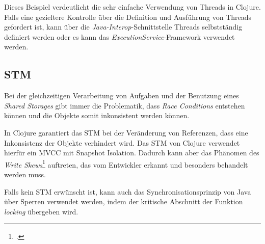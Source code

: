 Dieses Beispiel verdeutlicht die sehr einfache Verwendung von Threads in Clojure. Falls eine gezieltere Kontrolle über die Definition und Ausführung von Threads gefordert ist, kann über die \textit{Java-Interop}-Schnittstelle Threads selbstständig definiert werden oder es kann das \textit{ExecutionService}-Framework verwendet werden.

\subsection*{\acl{STM}}
Bei der gleichzeitigen Verarbeitung von Aufgaben und der Benutzung eines \textit{Shared Storages} gibt immer die Problematik, dass \textit{Race Conditions} entstehen können und die Objekte somit inkonsistent werden können.

In Clojure garantiert das \acf{STM} bei der Veränderung von Referenzen, dass eine Inkonsistenz der Objekte verhindert wird. Das \acs{STM} von Clojure verwendet hierfür ein \ac{MVCC} mit Snapshot Isolation. Dadurch kann aber das Phänomen des \textit{Write Skews}\footcite[S. Seite 17]{RENZSTATE} auftreten, das vom Entwickler erkannt und besonders behandelt werden muss.

Falls kein \ac{STM} erwünscht ist, kann auch das Synchronisationsprinzip von Java über Sperren verwendet werden, indem der kritische Abschnitt der Funktion \textit{locking} übergeben wird.
